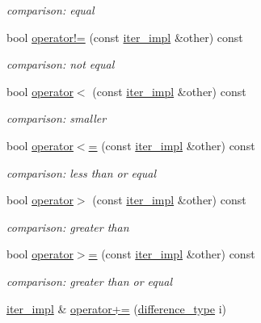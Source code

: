 \begin{DoxyCompactItemize}
\begin{DoxyCompactList}\small\item\em comparison\+: equal \end{DoxyCompactList}\item 
bool \mbox{\hyperlink{classnlohmann_1_1detail_1_1iter__impl_aeab0e2b5da70b3bdebecd5b1a6ee66a6}{operator!=}} (const \mbox{\hyperlink{classnlohmann_1_1detail_1_1iter__impl}{iter\+\_\+impl}} \&other) const
\begin{DoxyCompactList}\small\item\em comparison\+: not equal \end{DoxyCompactList}\item 
bool \mbox{\hyperlink{classnlohmann_1_1detail_1_1iter__impl_a0d14cd76203e00bdcef6a64a5d055cc7}{operator$<$}} (const \mbox{\hyperlink{classnlohmann_1_1detail_1_1iter__impl}{iter\+\_\+impl}} \&other) const
\begin{DoxyCompactList}\small\item\em comparison\+: smaller \end{DoxyCompactList}\item 
bool \mbox{\hyperlink{classnlohmann_1_1detail_1_1iter__impl_ac6f71b36d7c87e427d1fee83f2600fad}{operator$<$=}} (const \mbox{\hyperlink{classnlohmann_1_1detail_1_1iter__impl}{iter\+\_\+impl}} \&other) const
\begin{DoxyCompactList}\small\item\em comparison\+: less than or equal \end{DoxyCompactList}\item 
bool \mbox{\hyperlink{classnlohmann_1_1detail_1_1iter__impl_aaf3620b8dfa4bed8a9ac2b51dd55dbd7}{operator$>$}} (const \mbox{\hyperlink{classnlohmann_1_1detail_1_1iter__impl}{iter\+\_\+impl}} \&other) const
\begin{DoxyCompactList}\small\item\em comparison\+: greater than \end{DoxyCompactList}\item 
bool \mbox{\hyperlink{classnlohmann_1_1detail_1_1iter__impl_a634f85da575cb60b012a687efa26e11a}{operator$>$=}} (const \mbox{\hyperlink{classnlohmann_1_1detail_1_1iter__impl}{iter\+\_\+impl}} \&other) const
\begin{DoxyCompactList}\small\item\em comparison\+: greater than or equal \end{DoxyCompactList}\item 
\mbox{\hyperlink{classnlohmann_1_1detail_1_1iter__impl}{iter\+\_\+impl}} \& \mbox{\hyperlink{classnlohmann_1_1detail_1_1iter__impl_a3eef94f9d167046e7f773aeb6b78090c}{operator+=}} (\mbox{\hyperlink{classnlohmann_1_1detail_1_1iter__impl_a2f7ea9f7022850809c60fc3263775840}{difference\+\_\+type}} i)

\end{DoxyCompactItemize}
